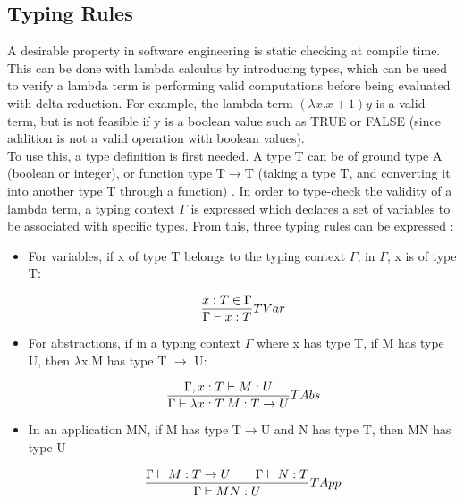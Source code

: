 \documentclass[a4paper,12pt]{report}
\begin{document}
\subsection{Typing Rules}

A desirable property in software engineering is static checking at compile time. This can be done with lambda calculus by introducing types, which can be used to verify a lambda term is performing valid computations before being evaluated with delta reduction. For example, the lambda term $(\lambda x.x+1)y$ is a valid term, but is not feasible if y is a boolean value such as TRUE or FALSE (since addition is not a valid operation with boolean values).\\

To use this, a type definition is first needed. A type T can be of ground type A (boolean or integer), or function type T$\rightarrow$T (taking a type T, and converting it into another type T through a function) \cite{Gay2019}. In order to type-check the validity of a lambda term, a typing context $\Gamma$ is expressed which declares a set of variables to be associated with specific types. From this, three typing rules can be expressed \cite{Gay2019}:

\begin{itemize}
	\item For variables, if x of type T belongs to the typing context $\Gamma$, in $\Gamma$, x is of type T:
	
	\begin{equation}
	\centering
	\frac{x:T\in \Gamma}{\Gamma \vdash x:T}TVar
	\label{variable_type}
	\end{equation}
	\item For abstractions, if in a typing context $\Gamma$ where x has type T, if M has type U, then $\lambda$x.M has type T $\rightarrow$ U:
	
	\begin{equation}
	\centering
	\frac{\Gamma ,x:T\vdash M:U}{\Gamma \vdash \lambda x:T.M:T \to U}TAbs
	\end{equation}
	\item  In an application MN, if M has type T$\rightarrow$U and N has type T, then MN has type U
	
	\begin{equation}
	\centering
	\frac{\Gamma \vdash M:T \to U \qquad \Gamma \vdash N:T}{\Gamma \vdash MN:U}TApp
	\label{application_types}
	\end{equation}
\end{itemize}
\end{document}
